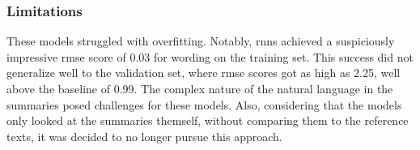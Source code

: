 
\subsubsection{Limitations}
These models struggled with overfitting. Notably, \glspl{rnn} achieved a suspiciously impressive \gls{rmse} score of 0.03 for wording on the training set. This success did not generalize well to the validation set, where \gls{rmse} scores got as high as 2.25, well above the baseline of 0.99. The complex nature of the natural language in the summaries posed challenges for these models. Also, considering that the models only looked at the summaries themself, without comparing them to the reference texts, it was decided to no longer pursue this approach.
